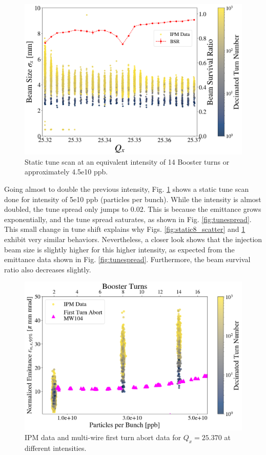 \begin{figure}[H]
    \centering
    \includegraphics[width=\columnwidth]{chapter6/static14turns_dampersOFF.png}
    \caption{Static tune scan at an equivalent intensity of 14 Booster turns or approximately 4.5e10 ppb.}
    \label{fig:static14_scatter}
   \vspace{-1.25em}
\end{figure}

Going almost to double the previous intensity, Fig. \ref{fig:static14_scatter} shows a static tune scan done for intensity of 5e10 ppb (particles per bunch). While the intensity is almost doubled, the tune spread only jumps to 0.02. This is because the emittance grows exponentially, and the tune spread saturates, as shown in Fig. \ref{fig:tunespread}. This small change in tune shift explains why Figs. \ref{fig:static8_scatter} and \ref{fig:static14_scatter} exhibit very similar behaviors. Nevertheless, a closer look shows that the injection beam size is slightly higher for this higher intensity, as expected from the emittance data shown in Fig. \ref{fig:tunespread}. Furthermore, the beam survival ratio also decreases slightly. 

\begin{figure}[H]
    \centering
    \includegraphics[width=\columnwidth]{chapter6/25370_scatter.png}
    \caption{IPM data and multi-wire first turn abort data for $Q_x=25.370$ at different intensities.}
    \label{fig:25370_scatter}
   \vspace{-1.25em}
\end{figure}

